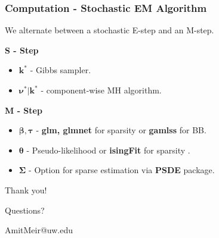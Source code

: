 \documentclass{beamer}
\theoremstyle{definition}
\begin{document}

\begin{frame}
\frametitle{Computation - Stochastic EM Algorithm}
We alternate between a stochastic E-step and an M-step. 



\vspace{0.75 cm}
\textbf{S - Step}
\begin{itemize}
\item $\boldsymbol{k^*}$ - Gibbs sampler.
\item $\boldsymbol{\nu^* | k^*}$ - component-wise MH algorithm. 
\end{itemize}


\vspace{0.75 cm}
\textbf{M - Step}
\begin{itemize}
\item $\boldsymbol{\beta, \tau}$ - \textbf{glm, glmnet} for sparsity or \textbf{gamlss} for BB.
\item $\boldsymbol{\theta}$ - Pseudo-likelihood or \textbf{isingFit} for sparsity .
\item $\boldsymbol{\Sigma}$ - Option for sparse estimation via \textbf{PSDE} package.
\end{itemize}
\end{frame}


\begin{frame}
\begin{center}
\huge{Thank you!}

\vspace{2 cm}
\LARGE{Questions?}

\vspace{1cm}
\large{AmitMeir@uw.edu}
\end{center}
\end{frame}
\end{document}
